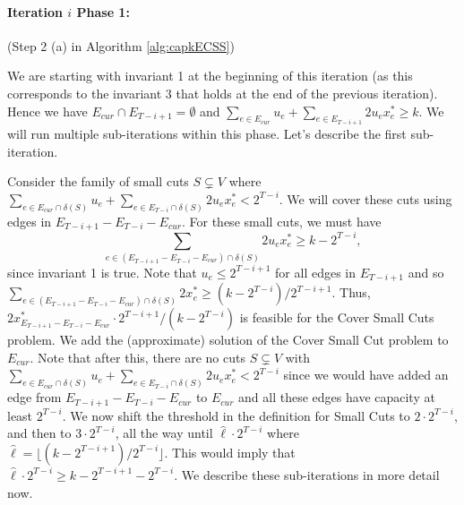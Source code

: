 \documentclass[11pt]{article}
\newcommand{\alphatwo}{2}
\begin{document}
{\paragraph{Iteration $i$ Phase 1:} (Step 2 (a) in Algorithm \ref{alg:capkECSS})

We are starting with invariant 1 at the beginning of this iteration
(as this corresponds to the invariant 3 that holds at the end of the previous iteration). Hence we
have $E_{cur} \cap E_{T-i+1} = \emptyset$ and $\sum_{e\in E_{cur}}u_e
+ \sum_{e\in E_{T-i + 1}} \alphatwo u_ex^*_e \geq k$. We will run
multiple sub-iterations within this phase. Let's describe the first
sub-iteration.

Consider the family of small cuts $S \subsetneq V$ where $\sum_{e\in E_{cur} \cap \delta(S)}u_e +
\sum_{e\in E_{T-i} \cap \delta(S)} \alphatwo u_ex^*_e < 2^{T-i}$. We will cover these
cuts using edges in $E_{T-i+1}-E_{T-i}-E_{cur}$. For these small cuts, we must have 
$$\sum_{e\in (E_{T-i+1}-E_{T-i}-E_{cur}) \cap \delta(S)}\alphatwo
u_ex^*_e \geq k-2^{T-i},$$ 
since invariant 1 is true. Note that
$u_e \leq 2^{T-i+1}$ for all edges in $E_{T-i+1}$ and so $\sum_{e\in
(E_{T-i+1}-E_{T-i}-E_{cur}) \cap \delta(S)}\alphatwo x^*_e \geq (k-2^{T-i})/2^{T-i+1}$.
Thus, $\alphatwo x^*_{E_{T-i+1}-E_{T-i}-E_{cur}} \cdot 2^{T-i+1}/(k-2^{T-i})$
is feasible for the Cover Small Cuts problem. We add the (approximate)
solution of the Cover Small Cut problem to $E_{cur}$. Note that
after this, there are no cuts $S \subsetneq V$ with $\sum_{e\in E_{cur} \cap \delta(S)}u_e +
\sum_{e\in E_{T-i} \cap \delta(S)} \alphatwo u_ex^*_e < 2^{T-i}$ since we would have
added an edge from $E_{T-i+1}-E_{T-i}-E_{cur}$ to $E_{cur}$ and all
these edges have capacity at least $2^{T-i}$. We now shift the
threshold in the definition for Small Cuts to $2\cdot 2^{T-i}$, and
then to $3\cdot 2^{T-i}$, all the way until $\hat{\ell}\cdot 2^{T-i}$
where $\hat{\ell} = \lfloor (k-2^{T-i+1})/2^{T-i} \rfloor$. This
would imply that  $\hat{\ell}\cdot2^{T-i}\geq k-2^{T-i+1} - 2^{T-i}$.
We describe these sub-iterations in more detail now.

}
\end{document}
